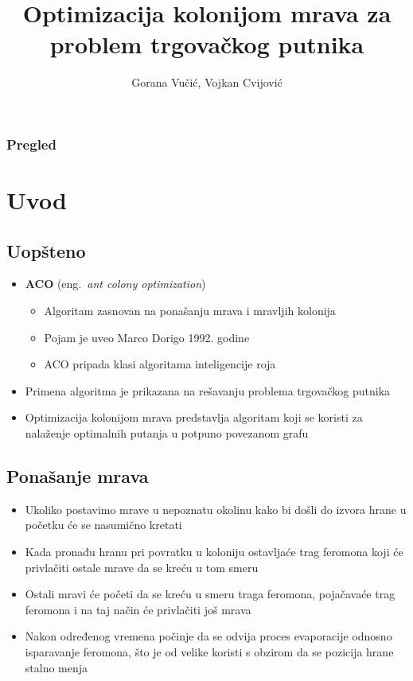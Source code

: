 \documentclass[11pt]{beamer}
\author{Gorana Vučić, Vojkan Cvijović}
\title{Optimizacija kolonijom mrava za problem trgovačkog putnika}
\institute{Naučno izračunavanje\break  Matematički fakultet, Beograd}
\begin{document}
\begin{frame}
\titlepage
\end{frame}

\begin{frame}
\frametitle{Pregled}
\tableofcontents
\end{frame}

\section{Uvod}
\subsection{Uopšteno}
\begin{frame}{}
  \begin{itemize}
  \item {\bf{ACO}} (eng.~{\em{ant colony optimization}})
    \begin{itemize}
    \item Algoritam zasnovan na ponašanju mrava i mravljih kolonija
    \item Pojam je uveo Marco Dorigo 1992. godine
    \item ACO pripada klasi algoritama inteligencije roja
    \end{itemize}
  \item {Primena algoritma je prikazana na rešavanju problema trgovačkog putnika}
  \item {Optimizacija kolonijom mrava predstavlja algoritam koji se koristi za nalaženje optimalnih putanja u potpuno povezanom grafu}

  \end{itemize}
\end{frame}

\subsection{Ponašanje mrava}
\begin{frame}{}
    \begin{itemize}
    \item Ukoliko postavimo mrave u nepoznatu okolinu kako bi došli do izvora hrane u početku će se nasumično kretati
    \item Kada pronađu hranu pri povratku u koloniju ostavljaće trag feromona koji će privlačiti ostale mrave da se kreću u tom smeru
    \item Ostali mravi će početi da se kreću u smeru traga feromona, pojačavaće trag feromona i na taj način će privlačiti još mrava
    \item Nakon određenog vremena počinje da se odvija proces evaporacije odnosno isparavanje feromona, što je od velike koristi s obzirom da se pozicija hrane stalno menja
    \end{itemize}
\end{frame}
\end{document}
